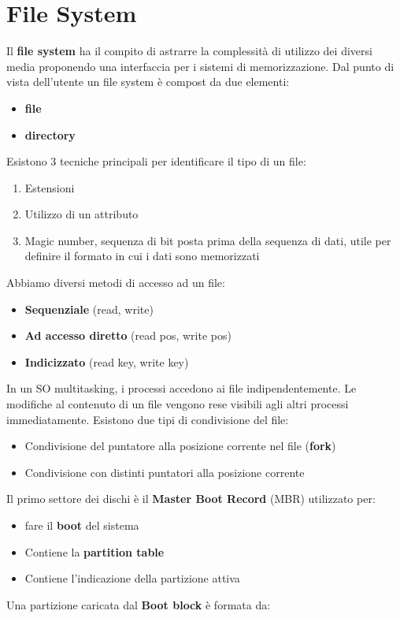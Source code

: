 \documentclass{article}
\begin{document}
\section{File System}
Il \textbf{file system} ha il compito di astrarre la complessità di utilizzo dei diversi media proponendo una interfaccia per i sistemi di memorizzazione. Dal punto di vista dell'utente un file system è compost da due elementi:
\begin{itemize}
  \item \textbf{file}
  \item \textbf{directory}
\end{itemize}
Esistono $3$ tecniche principali per identificare il tipo di un file:
\begin{enumerate}
  \item Estensioni
  \item Utilizzo di un attributo
  \item Magic number, sequenza di bit posta prima della sequenza di dati, utile per definire il formato in cui i dati sono memorizzati
\end{enumerate}
Abbiamo diversi metodi di accesso ad un file:
\begin{itemize}
  \item \textbf{Sequenziale} (read, write)
  \item \textbf{Ad accesso diretto} (read pos, write pos)
  \item \textbf{Indicizzato} (read key, write key)
\end{itemize}
In un SO multitasking, i processi accedono ai file indipendentemente. Le modifiche al contenuto di un file vengono rese visibili agli altri processi immediatamente. Esistono due tipi di condivisione del file:
\begin{itemize}
  \item Condivisione del puntatore alla posizione corrente nel file (\textbf{fork})
  \item Condivisione con distinti puntatori alla posizione corrente
\end{itemize}
Il primo settore dei dischi è il \textbf{Master Boot Record} (MBR) utilizzato per:
\begin{itemize}
  \item fare il \textbf{boot} del sistema
  \item Contiene la \textbf{partition table}
  \item Contiene l'indicazione della partizione attiva
\end{itemize}
Una partizione caricata dal \textbf{Boot block} è formata da:
\end{document}
